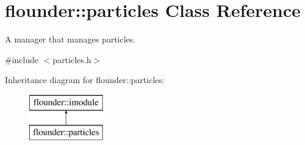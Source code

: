 \hypertarget{classflounder_1_1particles}{}\section{flounder\+:\+:particles Class Reference}
\label{classflounder_1_1particles}


A manager that manages particles.  




{\ttfamily \#include $<$particles.\+h$>$}

Inheritance diagram for flounder\+:\+:particles\+:\begin{figure}[H]
\begin{center}
\leavevmode
\includegraphics[height=2.000000cm]{classflounder_1_1particles}
\end{center}
\end{figure}
